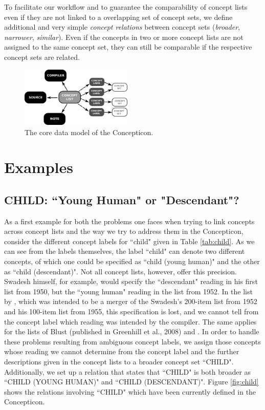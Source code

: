\documentclass[10pt, a4paper]{article}
\begin{document}
To facilitate our workflow and to guarantee the comparability of concept lists even if they are
not linked to a overlapping set of concept sets, we define additional and very simple
\emph{concept relations} between concept sets (\emph{broader}, \emph{narrower}, \emph{similar}).
Even if the concepts in two or more concept lists are not assigned to the same concept set, they can
still be comparable if the respective concept sets are related.

\begin{figure}[h]
  \includegraphics[width=0.475\textwidth]{img/concepticon.pdf}
  \caption{The core data model of the Concepticon.}
  \label{fig:concepticon}
\end{figure}



\section{Examples}
\subsection{CHILD: ``Young Human" or "Descendant"?}
As a first example for both the problems one faces when trying to link concepts across concept lists and the way we
try to address them in the Concepticon, consider the different concept labels for ``child" given in
Table \ref{tab:child}. As we can see from the labels themselves, the label ``child" can denote two
different concepts, of which one could be specified as ``child (young human)" and the other as
``child (descendant)". Not all concept lists, however, offer this precision. Swadesh himself, for
example, would specify the ``descendant" reading in his first list from 1950, but the ``young human"
reading in the list from 1952. In the list by , which was intended to be a merger of
the Swadesh's 200-item list from 1952 and his 100-item list from 1955, this specification is lost,
and we cannot tell from the concept label which reading was intended by the compiler. The same
applies for the lists of Blust (published in Greenhill et al., 2008) and .  In order to handle
these problems resulting from ambiguous concept labels, we assign those concepts whose reading we
cannot determine from the concept label and the further descriptions given in the concept lists to a
broader concept set ``CHILD". Additionally, we set up a relation that states that ``CHILD" is both
broader as ``CHILD (YOUNG HUMAN)" and ``CHILD (DESCENDANT)". Figure \ref{fig:child} shows the
relations involving ``CHILD" which have been currently defined in the Concepticon.
 
\end{document}
